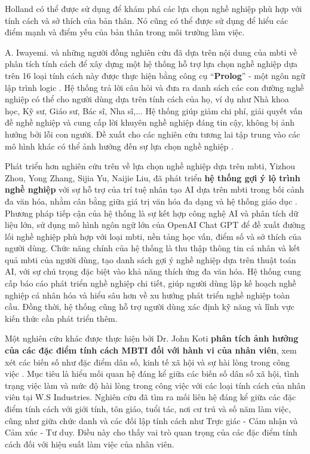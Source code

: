 Holland có thể được sử dụng để khám phá các lựa chọn nghề nghiệp phù hợp với tính cách và sở thích của bản thân. Nó cũng có thể được sử dụng để hiểu các điểm mạnh và điểm yếu của bản thân trong môi trường làm việc. 

A. Iwayemi. và những người đồng nghiên cứu đã dựa trên nội dung của \acrshort{mbti} về phân tích  tính cách để xây dựng một hệ thống hỗ trợ lựa chọn nghề nghiệp dựa trên 16 loại tính cách này được thực hiện bằng công cụ ``\textbf{Prolog}” - một ngôn ngữ lập trình logic \cite{iwayemi}. Hệ thống trả lời câu hỏi và đưa ra danh sách các con đường nghề nghiệp có thể cho người dùng dựa trên tính cách của họ, ví dụ như Nhà khoa học, Kỹ sư, Giáo sư, Bác sĩ, Nha sĩ,... Hệ thống giúp giảm chi phí, giải quyết vấn đề nghề nghiệp và cung cấp lời khuyên nghề nghiệp đáng tin cậy, không bị ảnh hưởng bởi lỗi con người. Đề xuất cho các nghiên cứu tương lai tập trung vào các mô hình khác có thể ảnh hưởng đến sự lựa chọn nghề nghiệp . 

Phát triển hơn nghiên cứu trên về lựa chọn nghề nghiệp dựa trên \acrshort{mbti}, Yizhou Zhou, Yong Zhang, Sijia Yu, Naijie Liu, đã phát triển \textbf{hệ thống gợi ý lộ trình nghề nghiệp} với sự hỗ trợ của trí tuệ nhân tạo AI dựa trên \acrshort{mbti} trong bối cảnh đa văn hóa, nhằm cân bằng giữa giá trị văn hóa đa dạng và hệ thống giáo dục \cite{yizhou}. Phương pháp tiếp cận của hệ thống là sự kết hợp công nghệ AI và phân tích dữ liệu lớn, sử dụng mô hình ngôn ngữ lớn của OpenAI Chat GPT để đề xuất đường lối nghề nghiệp phù hợp với loại \acrshort{mbti}, nền tảng học vấn, điểm số và sở thích của người dùng. Chức năng chính của hệ thống là thu thập thông tin cá nhân và kết quả \acrshort{mbti} của người dùng, tạo danh sách gợi ý nghề nghiệp dựa trên thuật toán AI, với sự chú trọng đặc biệt vào khả năng thích ứng đa văn hóa. Hệ thống cung cấp báo cáo phát triển nghề nghiệp chi tiết, giúp người dùng lập kế hoạch nghề nghiệp cá nhân hóa và hiểu sâu hơn về xu hướng phát triển nghề nghiệp toàn cầu. Đồng thời, hệ thống cũng hỗ trợ người dùng xác định kỹ năng và lĩnh vực kiến thức cần phát triển thêm. 

Một nghiên cứu khác được thực hiện bởi Dr. John Koti \textbf{phân tích ảnh hưởng của các đặc điểm tính cách MBTI đối với hành vi của nhân viên}, xem xét các biến số như đặc điểm dân số, kinh tế xã hội và sự hài lòng trong công việc \cite{drjohn}. Mục tiêu là hiểu mối quan hệ đáng kể giữa các biến số dân số xã hội, tình trạng việc làm và mức độ hài lòng trong công việc với các loại tính cách của nhân viên tại W.S Industries. Nghiên cứu đã tìm ra mối liên hệ đáng kể giữa các đặc điểm tính cách với giới tính, tôn giáo, tuổi tác, nơi cư trú và số năm làm việc, cũng như giữa chức danh và các đối lập tính cách như Trực giác - Cảm nhận và Cảm xúc - Tư duy. Điều này cho thấy vai trò quan trọng của các đặc điểm tính cách đối với hiệu suất làm việc của nhân viên.


